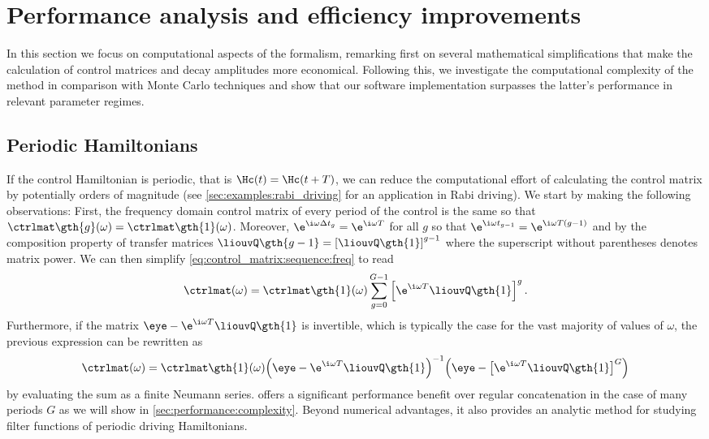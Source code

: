 \section{Performance analysis and efficiency improvements}\label{sec:performance}
In this section we focus on computational aspects of the formalism, remarking first on several mathematical simplifications that make the calculation of control matrices and decay amplitudes more economical. Following this, we investigate the computational complexity of the method in comparison with Monte Carlo techniques and show that our software implementation surpasses the latter's performance in relevant parameter regimes.

\subsection{Periodic Hamiltonians}\label{sec:performance:periodic_hamiltonians}
If the control Hamiltonian is periodic, that is $\Hc(t) = \Hc(t + T)$, we can reduce the computational effort of calculating the control matrix by potentially orders of magnitude (see \cref{sec:examples:rabi_driving} for an application in Rabi driving). We start by making the following observations: First, the frequency domain control matrix of every period of the control is the same so that $\ctrlmat\gth{g}(\omega) = \ctrlmat\gth{1}(\omega)$. Moreover, $\e^{\i\omega\Delta t_g} = \e^{\i\omega T}$ for all $g$ so that $\e^{\i\omega t_{g-1}} = \e^{\i\omega T(g - 1)}$ and by the composition property of transfer matrices $\liouvQ\gth{g-1} = \left[\liouvQ\gth{1}\right]^{g-1}$ where the superscript without parentheses denotes matrix power. We can then simplify \cref{eq:control_matrix:sequence:freq} to read
\begin{equation}\label{eq:control_matrix:sequence:periodic:explicit}
    \ctrlmat(\omega) = \ctrlmat\gth{1}(\omega)\sum_{g=0}^{G-1}\left[\e^{\i\omega T}\liouvQ\gth{1}\right]^g.
\end{equation}
Furthermore, if the matrix $\eye - \e^{\i\omega T}\liouvQ\gth{1}$ is invertible, which is typically the case for the vast majority of values of $\omega$, the previous expression can be rewritten as
\begin{equation}\label{eq:control_matrix:sequence:periodic:simplified}
    \ctrlmat(\omega) = \ctrlmat\gth{1}(\omega)\Bigl(\eye - \e^{\i\omega T}\liouvQ\gth{1}\Bigr)^{-1}
        \Bigl(\eye - \bigl[\e^{\i\omega T}\liouvQ\gth{1}\bigr]^G\Bigr)
\end{equation}
by evaluating the sum as a finite Neumann series.  offers a significant performance benefit over regular concatenation in the case of many periods $G$ as we will show in \cref{sec:performance:complexity}. Beyond numerical advantages, it also provides an analytic method for studying filter functions of periodic driving Hamiltonians.

